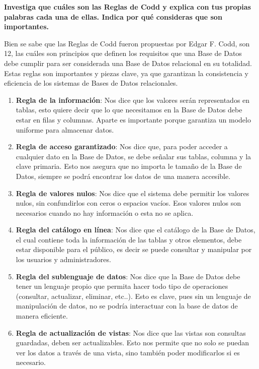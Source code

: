 \textbf{Investiga que cuáles son las Reglas de Codd y explica con tus propias palabras cada una de ellas. Indica por qué
consideras que son importantes.}\vspace{.3cm}

Bien se sabe que las Reglas de Codd fueron propuestas por Edgar F. Codd, son 12, las cuáles son principios que definen los requisitos que una Base de Datos debe cumplir para ser considerada una Base de Datos relacional en su totalidad. Estas reglas son importantes y piezas clave, ya que garantizan la consistencia y eficiencia de los sistemas de Bases de Datos relacionales.

\begin{enumerate}
    \item \textbf{Regla de la información}: Nos dice que los valores serán representados en tablas, esto quiere decir que lo que necesitamos en la Base de Datos debe estar en filas y columnas. Aparte es importante porque garantiza un modelo uniforme para almacenar datos.

    \item \textbf{Regla de acceso garantizado}: Nos dice que, para poder acceder a cualquier dato en la Base de Datos, se debe señalar sus tablas, columna y la clave primaria. Esto nos asegura que no importa le tamaño de la Base de Datos, siempre se podrá encontrar los datos de una manera accesible.

    \item \textbf{Regla de valores nulos}: Nos dice que el sistema debe permitir los valores nulos, sin confundirlos con ceros o espacios vacíos. Esos valores nulos son necesarios cuando no hay información o esta no se aplica.

    \item \textbf{Regla del catálogo en línea}: Nos dice que el catálogo de la Base de Datos, el cual contiene toda la información de las tablas y otros elementos, debe estar disponible para el público, es decir se puede consultar y manipular por los usuarios y administradores.

    \item \textbf{Regla del sublenguaje de datos}: Nos dice que la Base de Datos debe tener un lenguaje propio que permita hacer todo tipo de operaciones (consultar, actualizar, eliminar, etc..). Esto es clave, pues sin un lenguaje de manipulación de datos, no se podría interactuar con la base de datos de manera eficiente.

    \item \textbf{Regla de actualización de vistas}: Nos dice que las vistas son consultas guardadas, deben ser actualizables. Esto nos permite que no solo se puedan ver los datos a través de una vista, sino también poder modificarlos si es necesario.


\end{enumerate}
